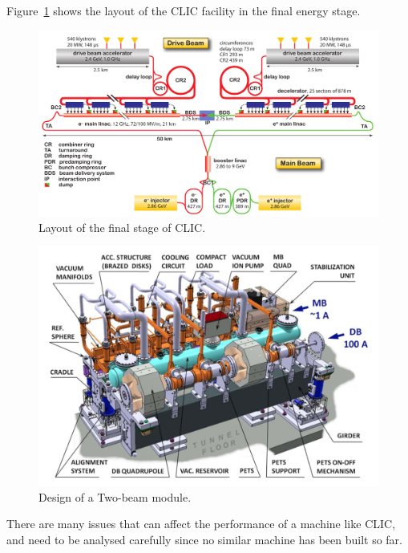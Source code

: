 Figure~\ref{CLIC_layout} shows the layout of the CLIC facility in the final energy stage.

\begin{figure}[h]
\centering

\includegraphics[scale=0.39]{pictures/CLIC_layout_3Tev}
\caption{Layout of the final stage of CLIC.}
\label{CLIC_layout}

\end{figure}

\begin{figure}

\includegraphics[scale=0.39]{pictures/TBM}
\caption{Design of a Two-beam module. }
\label{TBM}

\end{figure}







There are many issues that can affect the performance of a machine like CLIC, and need to be analysed carefully since no similar machine has been built so far. 

